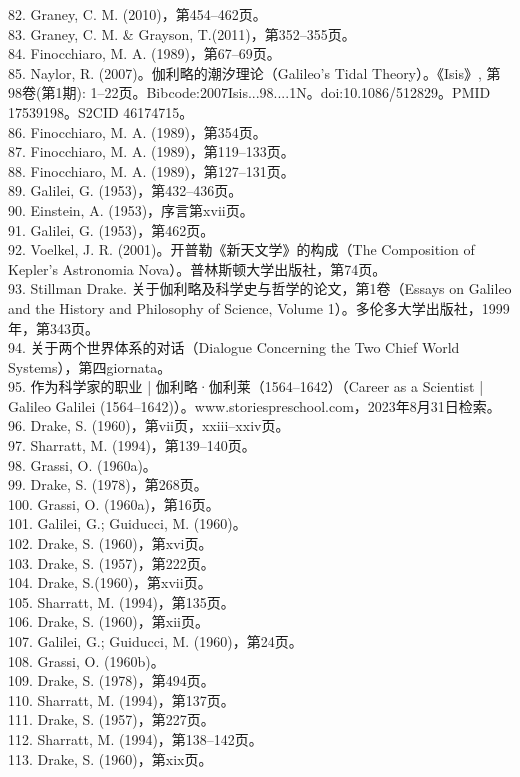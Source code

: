 82. Graney, C. M. (2010)，第454–462页。\\
83. Graney, C. M. & Grayson, T.(2011)，第352–355页。\\
84. Finocchiaro, M. A. (1989)，第67–69页。\\
85. Naylor, R. (2007)。伽利略的潮汐理论（Galileo's Tidal Theory）。《Isis》, 第98卷(第1期): 1–22页。Bibcode:2007Isis...98....1N。doi:10.1086/512829。PMID 17539198。S2CID 46174715。\\
86. Finocchiaro, M. A. (1989)，第354页。\\
87. Finocchiaro, M. A. (1989)，第119–133页。\\
88. Finocchiaro, M. A. (1989)，第127–131页。\\
89. Galilei, G. (1953)，第432–436页。\\
90. Einstein, A. (1953)，序言第xvii页。\\
91. Galilei, G. (1953)，第462页。\\
92. Voelkel, J. R. (2001)。开普勒《新天文学》的构成（The Composition of Kepler's Astronomia Nova）。普林斯顿大学出版社，第74页。\\
93. Stillman Drake. 关于伽利略及科学史与哲学的论文，第1卷（Essays on Galileo and the History and Philosophy of Science, Volume 1）。多伦多大学出版社，1999年，第343页。\\
94. 关于两个世界体系的对话（Dialogue Concerning the Two Chief World Systems），第四giornata。\\
95. 作为科学家的职业 | 伽利略·伽利莱（1564–1642）（Career as a Scientist | Galileo Galilei (1564–1642)）。www.storiespreschool.com，2023年8月31日检索。\\
96. Drake, S. (1960)，第vii页，xxiii–xxiv页。\\
97. Sharratt, M. (1994)，第139–140页。\\
98. Grassi, O. (1960a)。\\
99. Drake, S. (1978)，第268页。\\
100. Grassi, O. (1960a)，第16页。\\
101. Galilei, G.; Guiducci, M. (1960)。\\
102. Drake, S. (1960)，第xvi页。\\
103. Drake, S. (1957)，第222页。\\
104. Drake, S.(1960)，第xvii页。\\
105. Sharratt, M. (1994)，第135页。\\
106. Drake, S. (1960)，第xii页。\\
107. Galilei, G.; Guiducci, M. (1960)，第24页。\\
108. Grassi, O. (1960b)。\\
109. Drake, S. (1978)，第494页。\\
110. Sharratt, M. (1994)，第137页。\\
111. Drake, S. (1957)，第227页。\\
112. Sharratt, M. (1994)，第138–142页。\\
113. Drake, S. (1960)，第xix页。\\
